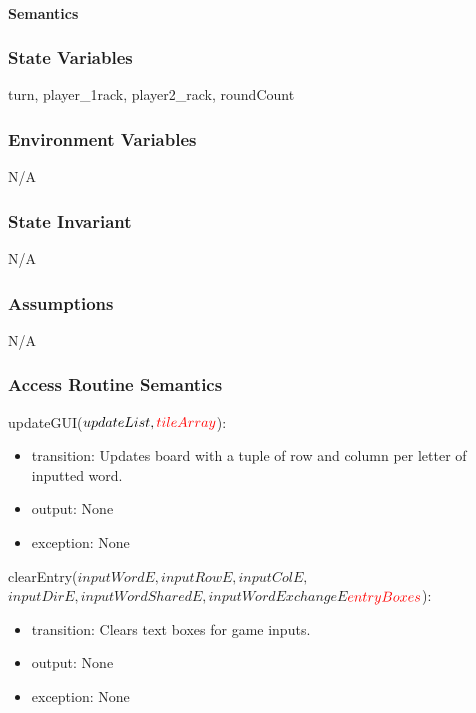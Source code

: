 \documentclass[12pt]{article}
\begin{document}
\paragraph* {Semantics}

\subsubsection*{State Variables}

turn, player\_1rack, player2\_rack, roundCount

\subsubsection*{Environment Variables}

N/A

\subsubsection*{State Invariant}

N/A

\subsubsection*{Assumptions}

N/A

\subsubsection* {Access Routine Semantics}

\noindent updateGUI($updateList, \textcolor{red}{tileArray}$):
\begin{itemize}
\item transition: Updates board with a tuple of row and column per letter of inputted word.
\item output: None
\item exception: None
\end{itemize}

\noindent clearEntry(\sout{$inputWordE, inputRowE, inputColE,$} \\ \sout{$inputDirE,inputWordSharedE, inputWordExchangeE$}$ \\ \textcolor{red}{entryBoxes}$):
\begin{itemize}
\item transition: Clears text boxes for game inputs.
\item output: None
\item exception: None
\end{itemize}
\end{document}
